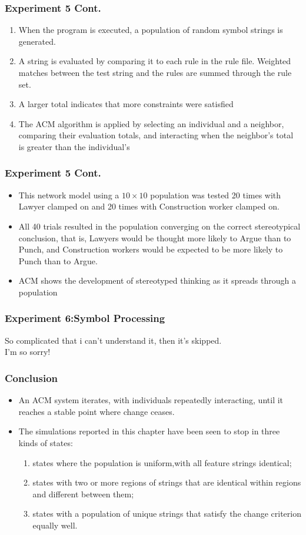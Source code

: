 \documentclass[CJK]{beamer}
\begin{document}
\begin{CJK*}{GBK}{song}
\begin{frame}
\frametitle{Experiment 5 Cont.}
\begin{enumerate}
\item{When the program is executed, a population of random symbol strings is generated.}
\item{A string is evaluated by comparing it to each rule in the rule file. Weighted matches between the test string and the rules are summed through the rule set.}
\item{A larger total indicates that more constraints were satisfied}
\item{The ACM algorithm is applied by selecting an individual and a neighbor, comparing their evaluation totals, and interacting when the neighbor’s total is greater than the individual’s}
\end{enumerate}
\end{frame}
\begin{frame}
\frametitle{Experiment 5 Cont.}
\begin{itemize}
\item{This network model using a $10\times10$ population was tested 20 times with Lawyer clamped on and 20 times with Construction worker clamped on.}
\item{All 40 trials resulted in the population converging on the correct stereotypical conclusion, that is, Lawyers would be thought more likely to Argue than to Punch, and Construction workers would be expected to be more likely to Punch than to Argue.}
\item{ACM shows the development of stereotyped thinking as it spreads through a population}
\end{itemize}
\end{frame}
\begin{frame}
\frametitle{Experiment 6:Symbol Processing}
\begin{center}
So complicated that i can't understand it, then it's skipped.\\
I'm so sorry!
\end{center}
\end{frame}

\begin{frame}
\frametitle{Conclusion}
\begin{itemize}
\item{An ACM system iterates, with individuals repeatedly interacting, until it reaches a stable point where change ceases.}
\item{The simulations reported in this chapter have been seen to stop in three kinds of states:}
\begin{enumerate}
\item{states where the population is uniform,with all feature strings identical;}
\item{states with two or more regions of strings that are identical within regions and different between them;}
\item{states with a population of unique strings that satisfy the change criterion equally well.}
\end{enumerate}
\end{itemize}
\end{frame}


\end{CJK*}
\end{document}
